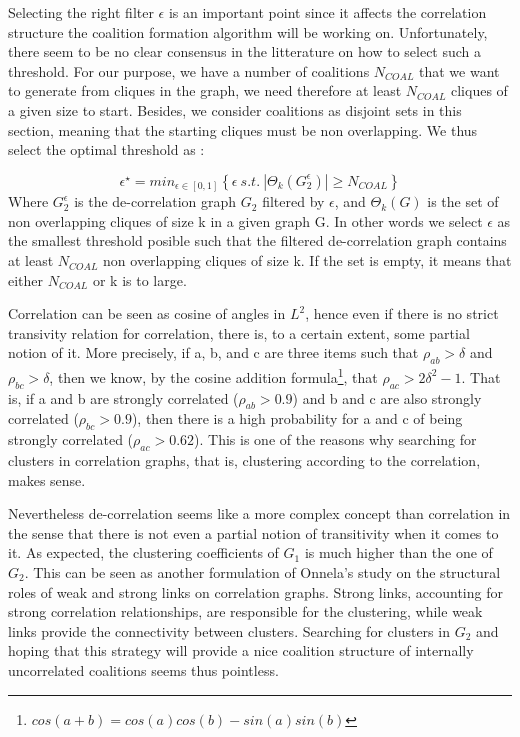 \documentclass[conference]{IEEEtran}
\begin{document}
Selecting the right filter $ \epsilon $ is an important point since it affects the correlation structure the coalition formation algorithm will be working on. Unfortunately, there seem to be no clear consensus in the litterature on how to select such a threshold. For our purpose, we have a number of coalitions $ N_{COAL} $ that we want to generate from cliques in the graph, we need therefore at least $ N_{COAL} $ cliques of a given size to start. Besides, we consider coalitions as disjoint sets in this section, meaning that the starting cliques must be non overlapping. We thus select the optimal threshold as :

\begin{equation}
\epsilon^{\star} = min_{ \epsilon \in [0,1]} \left\{ \epsilon\ s.t.\ |\Theta_{k}(G_{2}^{\epsilon})| \geq N_{COAL} \right\}
\end{equation} 
Where $ G_{2}^{\epsilon} $ is the de-correlation graph $ G_{2} $ filtered by $ \epsilon $, and $ \Theta_{k}(G) $ is the set of non overlapping cliques of size k in a given graph G. In other words we select $ \epsilon $ as the smallest threshold posible such that the filtered de-correlation graph contains at least $ N_{COAL} $ non overlapping cliques of size k. If the set is empty, it means that either $ N_{COAL} $ or k is to large. 

Correlation can be seen as cosine of angles in $ L^{2} $, hence even if there is no strict transivity relation for correlation, there is, to a certain extent, some partial notion of it. More precisely, if a, b, and c are three items such that $ \rho_{ab} > \delta $ and $ \rho_{bc} > \delta $, then we know, by the cosine addition formula\footnote{ $ cos(a+b) = cos(a)cos(b) - sin(a)sin(b) $ }, that $ \rho_{ac} > 2 \delta^{2} - 1 $. That is, if a and b are strongly correlated ($\rho_{ab} > 0.9 $) and b and c are also strongly correlated ($\rho_{bc} > 0.9 $), then there is a high probability for a and c of being strongly correlated ($\rho_{ac} > 0.62 $). This is one of the reasons why searching for clusters in correlation graphs, that is, clustering according to the correlation, makes sense.

Nevertheless de-correlation seems like a more complex concept than correlation in the sense that there is not even a partial notion of transitivity when it comes to it. As expected, the clustering coefficients of $ G_{1} $ is much higher than the one of $ G_{2} $. This can be seen as another formulation of Onnela's study on the structural roles of weak and strong links on correlation graphs. Strong links, accounting for strong correlation relationships, are responsible for the clustering, while weak links provide the connectivity between clusters. Searching for clusters in $ G_{2} $ and hoping that this strategy will provide a nice coalition structure of internally uncorrelated coalitions seems thus pointless.
\end{document}
